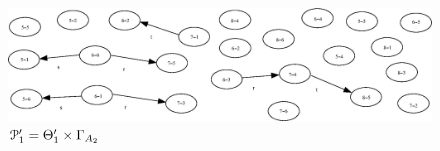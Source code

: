 \documentclass[a4paper,12pt]{article}
\newcommand{\G}{\Gamma }
\newcommand{\cP}{{\cal{P}}}
\numberwithin{equation}{section}
\numberwithin{figure}{section}
\begin{document}
\begin{figure}
\begin{center}
\includegraphics[scale=0.5, bb=0 0 400 410]{python/ex_K_i1-x-g.eps}
\caption{$\cP_1^\prime=\Theta_1^\prime\times \G_{A_2}$}
\label{fig:K_i1-x-g}
\end{center}
\end{figure}
\end{document}
